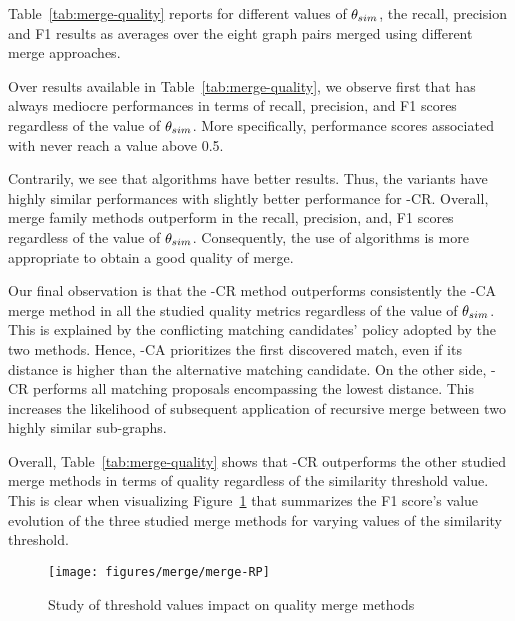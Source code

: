 Table~\ref{tab:merge-quality} reports for different values of $\theta_{sim}$, the recall, precision and F1 results as averages over the eight graph pairs merged using different merge approaches.


Over results available in Table~\ref{tab:merge-quality}, we observe first that \rlm{} has always mediocre performances in terms of recall, precision, and F1 scores regardless of the value of $\theta_{sim}$. More specifically, performance scores associated with \rlm{} never reach a value above 0.5.




Contrarily, we see that \mlm{} algorithms have better results. Thus, the \mlm{} variants have highly similar performances with slightly better performance for \mlm{}-CR.
Overall, \mlm{} merge family methods outperform \rlm{} in the recall, precision, and, F1 scores regardless of the value of $\theta_{sim}$. 
Consequently, the use of \mlm{} algorithms is more appropriate to obtain a good quality of merge.

Our final observation is that the \mlm{}-CR method outperforms consistently the \mlm{}-CA merge method in all the studied quality metrics regardless of the value of $\theta_{sim}$. 
This is explained by the conflicting matching candidates' policy adopted by the two methods.
Hence, \mlm{}-CA prioritizes the first discovered match, even if its distance is higher than the alternative matching candidate. On the other side, \mlm{}-CR performs all matching proposals encompassing the lowest distance. This increases the likelihood of subsequent application of recursive merge between two highly similar sub-graphs.



Overall, Table~\ref{tab:merge-quality}  shows that \mlm{}-CR outperforms the other studied merge methods in terms of quality regardless of the similarity threshold value.
This is clear when visualizing Figure~\ref{fig:merge-rp} that summarizes the F1 score's value evolution of the three studied merge methods for varying values of the similarity threshold.

\begin{figure}[t]
\centering
\texttt{[image: figures/merge/merge-RP]}
 \caption{Study of threshold values impact on quality merge methods}
 \label{fig:merge-rp}
\end{figure}

